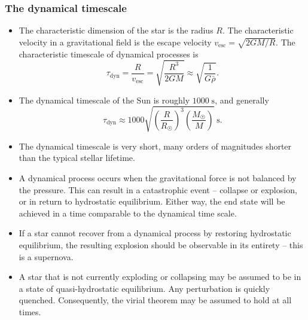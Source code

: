 \documentclass[10pt,amsmath,amssymb,aps,pra]{revtex4-2}
\newcommand{\unit}[1]{\;\mathrm{#1}}
\newcommand{\sub}[1]{_{\text{#1}}}
\newcommand{\rsun}{R_{\astrosun}}
\newcommand{\msun}{M_{\astrosun}}
\begin{document}
\subsubsection*{The dynamical timescale}
\begin{itemize}
\item The characteristic dimension of the star is the radius $R$. The
characteristic velocity in a gravitational field is the escape velocity
$v\sub{esc}=\sqrt{2GM/R}$. The characteristic timescale of dynamical processes
is
\begin{equation}
\tau\sub{dyn} = \frac{R}{v\sub{esc}} =
\sqrt{\frac{R^3}{2GM}} \approx \sqrt{\frac{1}{G\bar{\rho}}}.
\end{equation}

\item The dynamical timescale of the Sun is roughly $1000\unit{s}$, and
generally
\begin{equation}
\tau\sub{dyn} \approx
1000\sqrt{\left(\frac{R}{\rsun}\right)^3\left(\frac{\msun}{M}\right)}
\unit{s}.
\end{equation}

\item The dynamical timescale is very short, many orders of magnitudes shorter
than the typical stellar lifetime.

\item A dynamical process occurs when the gravitational force is not balanced
by the pressure. This can result in a catastrophic event -- collapse or
explosion, or in return to hydrostatic equilibrium. Either way, the end state
will be achieved in a time comparable to the dynamical time scale.

\item If a star cannot recover from a dynamical process by restoring hydrostatic
equilibrium, the resulting explosion should be observable in its entirety --
this is a supernova.

\item A star that is not currently exploding or collapsing may be assumed to be
in a state of quasi-hydrostatic equilibrium. Any perturbation is quickly
quenched. Consequently, the virial theorem may be assumed to hold at all times.
\end{itemize}
\end{document}
